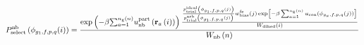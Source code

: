 \documentclass[12pt]{article}
\begin{document}
\begin{displaymath}
P_{\rm select}^{\rm nb}\left(\phi_{g_1,f,p,q}(i)\right) = 
{
{
\exp\left(-\beta {\sum_{a=1}^{n_{\rm g}\left(n\right)}} u_{\rm nb}^{\rm part}\left({\bf r}_a\left(i\right)\right)\right)
{
{
{{p_{\rm trial}^{\rm ideal}\left(\phi_{g_1,f,p,q}(j)\right)}\over{ p_{\rm trial}^{\rm arb}\left(\phi_{g_1,f,p,q}(j)\right)}}
w_{\rm bias}^{\rm fe}(j)
\exp\left[-\beta \sum_{a=1}^{n_{\rm g}(n)} u_{\rm con}\left(\phi_{g_a,f,p,q}(j)\right)\right]
}
\over
{
W_{\rm dihed}(i)
}
}
}\over{
W_{\rm nb}\left(n\right)
}
}
\end{displaymath}
\end{document}

